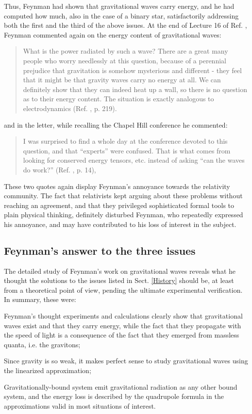 \documentclass{ws-procs961x669}            %
\begin{document}
Thus, Feynman had shown that gravitational waves carry energy, and
he had computed how much, also in the case of a binary star,
satisfactorily addressing both the first and the third of the
above issues. At the end of Lecture 16 of Ref.
, Feynman commented again on the energy
content of gravitational waves:
\begin{quote}
What is the power radiated by such a wave? There are a great many
people who worry needlessly at this question, because of a
perennial prejudice that gravitation is somehow mysterious and
different - they feel that it might be that gravity waves carry no
energy at all. We can definitely show that they can indeed heat up
a wall, so there is no question as to their energy content. The
situation is exactly analogous to electrodynamics (Ref.
, p. 219).
\end{quote}
%
and in the letter, while recalling the Chapel Hill conference he
commented:
\begin{quote}
I was surprised to find a whole day at the conference devoted to
this question, and that ``experts'' were confused. That is what
comes from looking for conserved energy tensors, etc. instead of
asking  ``can the waves do work?'' (Ref.
, p. 14),
\end{quote}
%
These two quotes again display Feynman's annoyance towards the
relativity community. The fact that relativists kept arguing about
these problems without reaching an agreement, and that they
privileged sophisticated formal tools to plain physical thinking,
definitely disturbed Feynman, who repeatedly expressed his
annoyance, and may have contributed to his loss of interest in the
subject.

\subsection{Feynman's answer to the three issues}

The detailed study of Feynman's work on gravitational waves
reveals what he thought the solutions to the issues listed in
Sect. \ref{History} should be, at least from a theoretical point
of view, pending the ultimate experimental verification. In
summary, these were:
\begin{arabiclist}[3]
\item Feynman's thought experiments and calculations clearly show
that gravitational waves exist and that they carry energy, while
the fact that they propagate with the speed of light is a
consequence of the fact that they emerged from massless quanta,
i.e. the gravitons; \item Since gravity is so weak, it makes
perfect sense to study gravitational waves using the linearized
approximation; \item Gravitationally-bound system emit
gravitational radiation as any other bound system, and the energy
loss is described by the quadrupole formula in the approximations
valid in most situations of interest.
\end{arabiclist}
\end{document}
